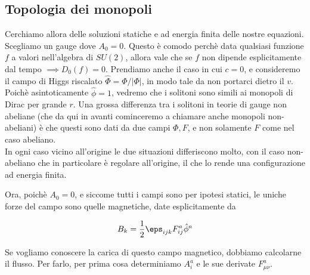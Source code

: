 \documentclass{report}
\begin{document}
\subsection{Topologia dei monopoli}

Cerchiamo allora delle soluzioni statiche e ad energia finita delle nostre equazioni. Scegliamo un gauge dove \(A_0 = 0\). Questo è comodo perchè data qualsiasi funzione \(f\) a valori nell'algebra di \(SU(2)\), allora vale che se \(f\) non dipende esplicitamente dal tempo \(\implies D_0(f) = 0\). Prendiamo anche il caso in cui \(c=0\), e consideremo il campo di Higgs riscalato \(\hat{\Phi} = \Phi / |\Phi|\), in modo tale da non portarci dietro il \(v\). \\

Poichè asintoticamente \(\hat{\phi} = 1\), vedremo che i solitoni sono simili ai monopoli di Dirac per grande \(r\). Una grossa differenza tra i solitoni in teorie di gauge non abeliane (che da qui in avanti cominceremo a chiamare anche monopoli non-abeliani) è che questi sono dati da due campi \(\Phi, F\), e non solamente \(F\) come nel caso abeliano. \\

In ogni caso vicino all'origine le due situazioni differiscono molto, con il caso non-abeliano che in particolare è regolare all'origine, il che lo rende una configurazione ad energia finita. 

Ora, poichè \(A_0 =0\), e siccome tutti i campi sono per ipotesi statici, le uniche forze del campo sono quelle magnetiche, date esplicitamente da 

\begin{align}
    B_k = \frac{1}{2}\eps_{ijk}F^a_{ij}\hat{\phi}^a
\end{align}

Se vogliamo conoscere la carica di questo campo magnetico, dobbiamo calcolarne il flusso. Per farlo, per prima cosa determiniamo \(A^a_i\) e le sue derivate \(F^a_{\mu\nu}\). 
\end{document}
